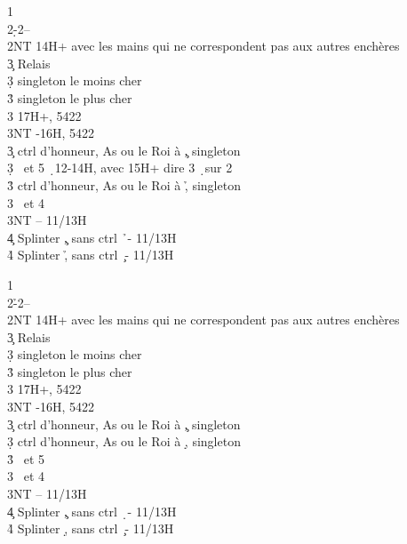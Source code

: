 \documentclass[a4paper]{article}
\begin{document}
\begin{bidtable}
1\c\\
2\d-2\s--\\
2NT \> 14H+ avec les mains qui ne correspondent pas aux autres enchères\+\\
3\c \> Relais\+\\
3\d \> singleton le moins cher\\
3\h \> singleton le plus cher\\
3\s \> 17H+, 5422\\
3NT -16H, 5422\-\-\\
3\c \> ctrl d’honneur, As ou le Roi à \c , singleton \h \\
3\d {} \s\ et 5 \d\ 12-14H, avec 15H+ dire 3 \d\ sur 2 \c \\
3\h \> ctrl d’honneur, As ou le Roi à \h , singleton \c \\
3\s {} \s\ et 4 \d \\
3NT  – 11/13H\\
4\c \> Splinter \c , sans ctrl \h\ - 11/13H\\
4\h \> Splinter \h , sans ctrl \c\ - 11/13H
\end{bidtable}

\begin{bidtable}
1\c\\
2\h-2\s--\\
2NT \> 14H+ avec les mains qui ne correspondent pas aux autres enchères\+\\
3\c \> Relais\+\\
3\d \> singleton le moins cher\\
3\h \> singleton le plus cher\\
3\s \> 17H+, 5422\\
3NT -16H, 5422\-\-\\
3\c \> ctrl d’honneur, As ou le Roi à \c , singleton \d \\
3\d \> ctrl d’honneur, As ou le Roi à \d , singleton \c \\
3\h {} \s\ et 5 \h \\
3\s {} \s\ et 4 \h \\
3NT  – 11/13H\\
4\c \> Splinter \c , sans ctrl \d\ - 11/13H\\
4\h \> Splinter \d , sans ctrl \c\ - 11/13H
\end{bidtable}
\end{document}
